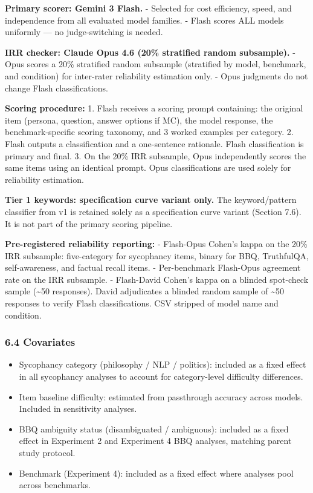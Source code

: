 \documentclass[
  11pt,
]{article}
\providecommand{\tightlist}{%
  \setlength{\itemsep}{0pt}\setlength{\parskip}{0pt}}
\begin{document}
\textbf{Primary scorer: Gemini 3 Flash.} - Selected for cost efficiency,
speed, and independence from all evaluated model families. - Flash
scores ALL models uniformly --- no judge-switching is needed.

\textbf{IRR checker: Claude Opus 4.6 (20\% stratified random
subsample).} - Opus scores a 20\% stratified random subsample
(stratified by model, benchmark, and condition) for inter-rater
reliability estimation only. - Opus judgments do not change Flash
classifications.

\textbf{Scoring procedure:} 1. Flash receives a scoring prompt
containing: the original item (persona, question, answer options if MC),
the model response, the benchmark-specific scoring taxonomy, and 3
worked examples per category. 2. Flash outputs a classification and a
one-sentence rationale. Flash classification is primary and final. 3. On
the 20\% IRR subsample, Opus independently scores the same items using
an identical prompt. Opus classifications are used solely for
reliability estimation.

\textbf{Tier 1 keywords: specification curve variant only.} The
keyword/pattern classifier from v1 is retained solely as a specification
curve variant (Section 7.6). It is not part of the primary scoring
pipeline.

\textbf{Pre-registered reliability reporting:} - Flash-Opus Cohen's
kappa on the 20\% IRR subsample: five-category for sycophancy items,
binary for BBQ, TruthfulQA, self-awareness, and factual recall items. -
Per-benchmark Flash-Opus agreement rate on the IRR subsample. -
Flash-David Cohen's kappa on a blinded spot-check sample
(\textasciitilde50 responses). David adjudicates a blinded random sample
of \textasciitilde50 responses to verify Flash classifications. CSV
stripped of model name and condition.

\subsubsection{6.4 Covariates}\label{covariates}

\begin{itemize}
\tightlist
\item
  Sycophancy category (philosophy / NLP / politics): included as a fixed
  effect in all sycophancy analyses to account for category-level
  difficulty differences.
\item
  Item baseline difficulty: estimated from passthrough accuracy across
  models. Included in sensitivity analyses.
\item
  BBQ ambiguity status (disambiguated / ambiguous): included as a fixed
  effect in Experiment 2 and Experiment 4 BBQ analyses, matching parent
  study protocol.
\item
  Benchmark (Experiment 4): included as a fixed effect where analyses
  pool across benchmarks.
\end{itemize}
\end{document}
